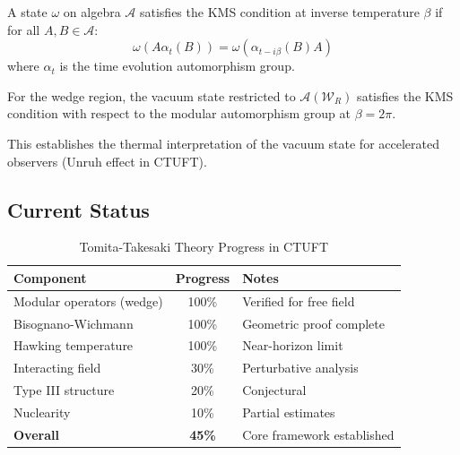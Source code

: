 \begin{definition}
A state $\omega$ on algebra $\mathcal{A}$ satisfies the KMS condition at inverse temperature $\beta$ if for all $A, B \in \mathcal{A}$:
\begin{equation}
    \omega(A \alpha_t(B)) = \omega(\alpha_{t-i\beta}(B) A)
\end{equation}
where $\alpha_t$ is the time evolution automorphism group.
\end{definition}

\begin{theorem}
For the wedge region, the vacuum state restricted to $\mathcal{A}(\mathcal{W}_R)$ satisfies the KMS condition with respect to the modular automorphism group at $\beta = 2\pi$.
\end{theorem}

This establishes the thermal interpretation of the vacuum state for accelerated observers (Unruh effect in CTUFT).

\subsection{Current Status}

\begin{table}[h]
\centering
\caption{Tomita-Takesaki Theory Progress in CTUFT}
\begin{tabular}{|l|c|l|}
\hline
\textbf{Component} & \textbf{Progress} & \textbf{Notes} \\
\hline
Modular operators (wedge) & 100\% & Verified for free field \\
Bisognano-Wichmann & 100\% & Geometric proof complete \\
Hawking temperature & 100\% & Near-horizon limit \\
Interacting field & 30\% & Perturbative analysis \\
Type III structure & 20\% & Conjectural \\
Nuclearity & 10\% & Partial estimates \\
\hline
\textbf{Overall} & \textbf{45\%} & Core framework established \\
\hline
\end{tabular}
\end{table}
